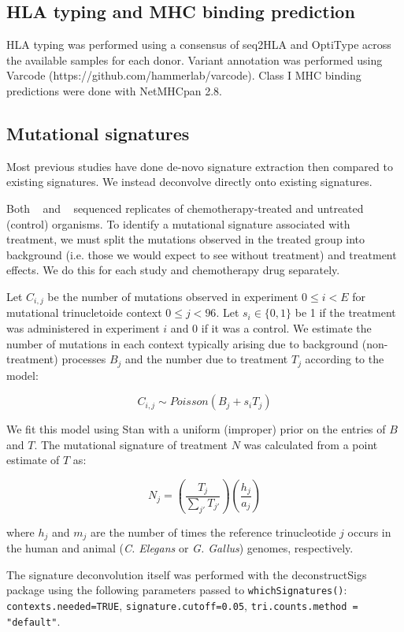 \subsection*{HLA typing and MHC binding prediction}
HLA typing was performed using a consensus of seq2HLA\cite{Boegel_2012} and OptiType\cite{Szolek_2014} across the available samples for each donor. Variant annotation was performed using Varcode (https://github.com/hammerlab/varcode). Class I MHC binding predictions were done with NetMHCpan 2.8\cite{Lundegaard_2008}.

\subsection*{Mutational signatures}
Most previous studies have done de-novo signature extraction then compared to existing signatures. We instead deconvolve directly onto existing signatures.

Both ~\cite{Meier_2014} and ~\cite{Szikriszt_2016} sequenced replicates of chemotherapy-treated and untreated (control) organisms. To identify a mutational signature associated with treatment, we must split the mutations observed in the treated group into background (i.e. those we would expect to see without treatment) and treatment effects. We do this for each study and chemotherapy drug separately.

Let $C_{i,j}$ be the number of mutations observed in experiment $0 \leq i < E$ for mutational trinucletoide context $0 \leq j < 96$. Let $s_i \in \{0,1\}$ be 1 if the treatment was administered in experiment $i$ and 0 if it was a control. We estimate the number of mutations in each context typically arising due to background (non-treatment) processes $B_j$ and the number due to treatment $T_j$ according to the model:

\[
C_{i,j} \sim \mathit{Poisson}(B_j + s_i T_j)
\]

We fit this model using Stan\cite{Gelman_2015} with a uniform (improper) prior on the entries of $B$ and $T$. The mutational signature of treatment $N$ was calculated from a point estimate of $T$ as:

\[
N_j = \left ( \frac{T_j}{\sum_{j'}{T_{j'}}} \right ) \left ( \frac{h_j}{a_j} \right )
\]

where $h_j$ and $m_j$ are the number of times the reference trinucleotide $j$ occurs in the human and animal (\textit{C. Elegans} or \textit{G. Gallus}) genomes, respectively.

The signature deconvolution itself was performed with the deconstructSigs\cite{Rosenthal_2016} package using the following parameters passed to \texttt{whichSignatures()}: \texttt{contexts.needed=TRUE}, \texttt{signature.cutoff=0.05}, \texttt{tri.counts.method = "default"}.

